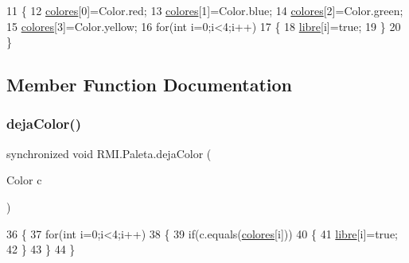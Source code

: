 \begin{DoxyCode}
11     \{
12         \mbox{\hyperlink{class_r_m_i_1_1_paleta_af04daaaad9a19f36a9274f916f450b5a}{colores}}[0]=Color.red;
13         \mbox{\hyperlink{class_r_m_i_1_1_paleta_af04daaaad9a19f36a9274f916f450b5a}{colores}}[1]=Color.blue;
14         \mbox{\hyperlink{class_r_m_i_1_1_paleta_af04daaaad9a19f36a9274f916f450b5a}{colores}}[2]=Color.green;
15         \mbox{\hyperlink{class_r_m_i_1_1_paleta_af04daaaad9a19f36a9274f916f450b5a}{colores}}[3]=Color.yellow;
16         \textcolor{keywordflow}{for}(\textcolor{keywordtype}{int} i=0;i<4;i++)
17         \{
18             \mbox{\hyperlink{class_r_m_i_1_1_paleta_a4b1b7b3121f983b09dfc9daf91620bad}{libre}}[i]=\textcolor{keyword}{true};
19         \}
20     \}
\end{DoxyCode}


\subsection{Member Function Documentation}
\mbox{\label{class_r_m_i_1_1_paleta_aece560f1c69d6f05c612dc7d60a06aaf}} 
\subsubsection{\texorpdfstring{deja\+Color()}{dejaColor()}}
{\footnotesize\ttfamily synchronized void R\+M\+I.\+Paleta.\+deja\+Color (\begin{DoxyParamCaption}\item[{Color}]{c }\end{DoxyParamCaption})\hspace{0.3cm}{\ttfamily [inline]}}


\begin{DoxyCode}
36     \{
37         \textcolor{keywordflow}{for}(\textcolor{keywordtype}{int} i=0;i<4;i++)
38         \{
39             \textcolor{keywordflow}{if}(c.equals(\mbox{\hyperlink{class_r_m_i_1_1_paleta_af04daaaad9a19f36a9274f916f450b5a}{colores}}[i]))
40             \{
41                 \mbox{\hyperlink{class_r_m_i_1_1_paleta_a4b1b7b3121f983b09dfc9daf91620bad}{libre}}[i]=\textcolor{keyword}{true};
42             \}
43         \}
44     \}
\end{DoxyCode}
\mbox{\label{class_r_m_i_1_1_paleta_a3d33527acb560a081844fdbce4e29195}} 
